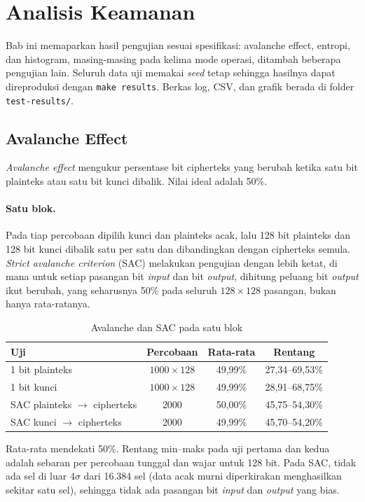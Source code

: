 \section{Analisis Keamanan}
Bab ini memaparkan hasil pengujian \algname{} sesuai spesifikasi: avalanche effect, entropi, dan
histogram, masing-masing pada kelima mode operasi, ditambah beberapa pengujian lain. Seluruh data
uji memakai \textit{seed} tetap sehingga hasilnya dapat direproduksi dengan \texttt{make results}.
Berkas log, CSV, dan grafik berada di folder \texttt{test-results/}.

\subsection{Avalanche Effect}
\textit{Avalanche effect} mengukur persentase bit cipherteks yang berubah ketika satu bit
plainteks atau satu bit kunci dibalik. Nilai ideal adalah 50\%.

\paragraph{Satu blok.} Pada tiap percobaan dipilih kunci dan plainteks acak, lalu 128 bit
plainteks dan 128 bit kunci dibalik satu per satu dan dibandingkan dengan cipherteks semula.
\textit{Strict avalanche criterion} (SAC) melakukan pengujian dengan lebih ketat, di mana
untuk setiap pasangan bit \textit{input} dan bit \textit{output}, dihitung peluang bit \textit{output} ikut 
berubah, yang seharusnya 50\% pada seluruh $128 \times 128$ pasangan, bukan hanya rata-ratanya.

\begin{table}[H]
  \centering
  \caption{Avalanche dan SAC pada satu blok}
  \begin{tabular}{lccc}
    \toprule
    Uji & Percobaan & Rata-rata & Rentang \\
    \midrule
    1 bit plainteks & $1000 \times 128$ & 49,99\% & 27,34--69,53\% \\
    1 bit kunci & $1000 \times 128$ & 49,99\% & 28,91--68,75\% \\
    SAC plainteks $\to$ cipherteks & 2000 & 50,00\% & 45,75--54,30\% \\
    SAC kunci $\to$ cipherteks & 2000 & 49,99\% & 45,70--54,20\% \\
    \bottomrule
  \end{tabular}
\end{table}

Rata-rata mendekati 50\%. Rentang min--maks pada uji pertama dan kedua adalah sebaran per
percobaan tunggal dan wajar untuk 128 bit. Pada SAC, tidak ada sel di luar $4\sigma$ dari 16.384
sel (data acak murni diperkirakan menghasilkan sekitar satu sel), sehingga tidak ada pasangan bit
\textit{input} dan \textit{output} yang bias.

